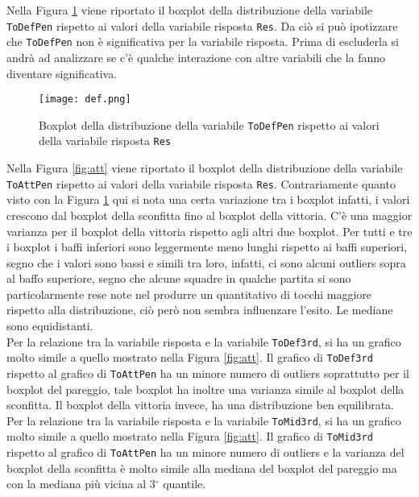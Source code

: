 Nella Figura \ref{fig:defp} viene riportato il boxplot della distribuzione della variabile \texttt{ToDefPen} rispetto ai valori della variabile risposta \texttt{Res}. Da ciò si può ipotizzare che \texttt{ToDefPen} non è significativa per la variabile risposta. Prima di escluderla si andrà ad analizzare se c'è qualche interazione con altre variabili che la fanno diventare significativa.\\
\begin{figure}[htbp]
	\begin{center}
		\texttt{[image: def.png]}
		\caption{Boxplot della distribuzione della variabile \texttt{ToDefPen} rispetto ai valori della variabile risposta \texttt{Res} } \label{fig:defp}
	\end{center}
\end{figure}
Nella Figura \ref{fig:att} viene riportato il boxplot della distribuzione della variabile \texttt{ToAttPen} rispetto ai valori della variabile risposta \texttt{Res}. Contrariamente quanto visto con la Figura \ref{fig:defp} qui si nota una certa variazione tra i boxplot infatti, i valori crescono dal boxplot della sconfitta fino al boxplot della vittoria. C'è una maggior varianza per il boxplot della vittoria rispetto agli altri due boxplot. Per tutti e tre i boxplot i baffi inferiori sono leggermente meno lunghi rispetto ai baffi superiori, segno che i valori sono bassi e simili tra loro, infatti, ci sono alcuni outliers sopra al baffo superiore, segno che alcune squadre in qualche partita si sono particolarmente rese note nel produrre un quantitativo di tocchi maggiore rispetto alla distribuzione, ciò però non sembra influenzare l'esito. Le mediane sono equidistanti.\\
Per la relazione tra la variabile risposta e la variabile \texttt{ToDef3rd}, si ha un grafico molto simile a quello mostrato nella Figura \ref{fig:att}. Il grafico di \texttt{ToDef3rd} rispetto al grafico di \texttt{ToAttPen} ha un minore numero di outliers soprattutto per il boxplot del pareggio, tale boxplot ha inoltre una varianza simile al boxplot della sconfitta. Il boxplot della vittoria invece, ha una distribuzione ben equilibrata.\\
Per la relazione tra la variabile risposta e la variabile \texttt{ToMid3rd}, si ha un grafico molto simile a quello mostrato nella Figura \ref{fig:att}. Il grafico di \texttt{ToMid3rd} rispetto al grafico di \texttt{ToAttPen} ha un minore numero di outliers e la varianza del boxplot della sconfitta è molto simile alla mediana del boxplot del pareggio ma con la mediana più vicina al 3$^{\circ}$ quantile.\\
